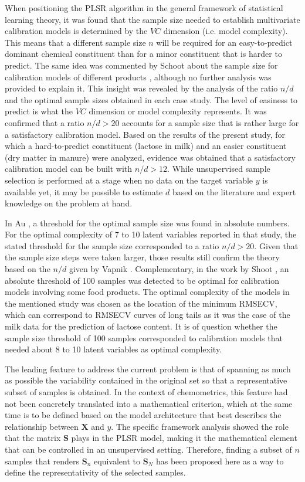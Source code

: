 \documentclass[journal=ancham,manuscript=article]{achemso}
\begin{document}
When positioning the PLSR algorithm in the general framework of statistical learning theory, it was found that the sample size needed to establish multivariate calibration models is determined by the $VC$ dimension (i.e. model complexity). This means that a different sample size $n$ will be required for an easy-to-predict dominant chemical constituent than for a minor constituent that is harder to predict. The same idea was commented by Schoot about the sample size for calibration models of different products \cite{Schoot2020}, although no further analysis was provided to explain it. This insight was revealed by the analysis of the ratio $n/d$ and the optimal sample sizes obtained in each case study. The level of easiness to predict is what the $VC$ dimension or model complexity represents. It was confirmed that a ratio $n/d>20$ accounts for a sample size that is rather large for a satisfactory calibration model. Based on the results of the present study, for which a hard-to-predict constituent (lactose in milk) and an easier constituent (dry matter in manure) were analyzed, evidence was obtained that a satisfactory calibration model can be built with $n/d>12$. While unsupervised sample selection is performed at a stage when no data on the target variable $y$ is available yet, it may be possible to estimate $d$ based on the literature and expert knowledge on the problem at hand.

In Au \cite{Au2020}, a threshold for the optimal sample size was found in absolute numbers. For the optimal complexity of 7 to 10 latent variables reported in that study, the stated threshold for the sample size corresponded to a ratio $n/d > 20$. Given that the sample size steps were taken larger, those results still confirm the theory based on the $n/d$ given by Vapnik \cite{Vapnik2000}. Complementary, in the work by Shoot  \cite{Schoot2020}, an absolute threshold of 100 samples was detected to be optimal for calibration models involving some food products. The optimal complexity of the models in the mentioned study was chosen as the location of the minimum RMSECV, which can correspond to RMSECV curves of long tails as it was the case of the milk data for the prediction of lactose content. It is of question whether the sample size threshold of 100 samples corresponded to calibration models that needed about 8 to 10 latent variables as optimal complexity.  

The leading feature to address the current problem is that of spanning as much as possible the variability contained in the original set so that a representative subset of samples is obtained. In the context of chemometrics, this feature had not been concretely translated into a mathematical criterion, which at the same time is to be defined based on the model architecture that best describes the relationship between $\mathbf{X}$ and $y$. The specific framework analysis showed the role that the matrix $\mathbf{S}$ plays in the PLSR model, making it the mathematical element that can be controlled in an unsupervised setting. Therefore, finding a subset of $n$ samples that renders $\mathbf{S}_n$ equivalent to $\mathbf{S}_N$ has been proposed here as a way to define the representativity of the selected samples. 
\end{document}
